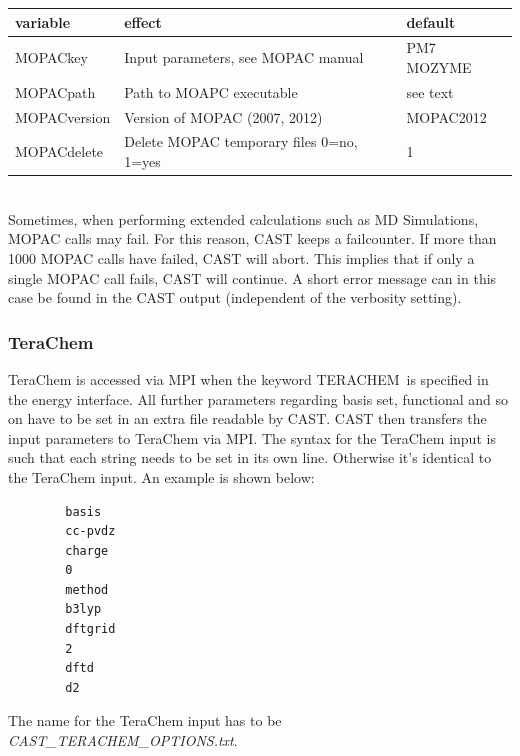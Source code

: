 \documentclass[10pt,a4paper]{article} %
\begin{document}
		\begin{tabularx}{\textwidth}{l|l|l}
			variable & effect & default \\
			\hline
			MOPACkey & Input parameters, see MOPAC manual & PM7 MOZYME\\
			MOPACpath & Path to MOAPC executable & see text\\
			MOPACversion & Version of MOPAC (2007, 2012) & MOPAC2012\\
			MOPACdelete & Delete MOPAC temporary files 0=no, 1=yes & 1\\

		\end{tabularx}~\\
		
		Sometimes, when performing extended calculations such as \ac{MD} Simulations, \ac{MOPAC} calls may fail. For this reason, \ac{CAST} keeps a failcounter. If more than 1000 \ac{MOPAC} calls have failed, \ac{CAST} will abort. This implies that if only a single \ac{MOPAC} call fails, \ac{CAST} will continue. A short error message can in this case be found in the \ac{CAST} output (independent of the verbosity setting).
		
		\subsubsection{TeraChem}
		TeraChem\supercite{terachem} is accessed via \ac{MPI}\supercite{mpi} when the keyword \glqq TERACHEM\grqq~is specified in the energy interface. All further parameters regarding basis set, functional and so on have to be set in an extra file readable by \ac{CAST}. \ac{CAST} then transfers the input parameters to TeraChem via \ac{MPI}. The syntax for the TeraChem input is such that each string needs to be set in its own line. Otherwise it's identical to the TeraChem input. An example is shown below:

		\begin{lstlisting}
		basis
		cc-pvdz
		charge
		0
		method
		b3lyp
		dftgrid
		2
		dftd
		d2\end{lstlisting}

		The name for the TeraChem input has to be \glqq \textit{CAST\_TERACHEM\_OPTIONS.txt}\grqq.
			
			
\end{document}
